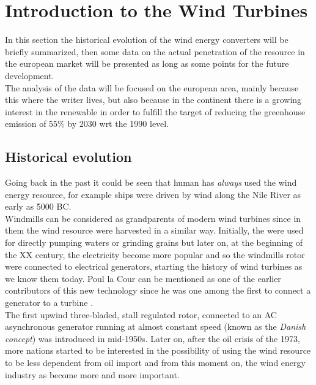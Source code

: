 \newpage
\section{Introduction to the Wind Turbines}\label{sec:c_WT_characteristics}
In this section the historical evolution of the wind energy converters will be briefly summarized, then some data on the actual penetration of the resource in the european market will be presented as long as some points for the future development. \\
The analysis of the data will be focused on the european area, mainly because this where the writer lives, but also because in the continent there is a growing interest in the renewable in order to fulfill the target of reducing the greenhouse emission of 55\% by 2030 wrt the 1990 level. 

\subsection{Historical evolution}
Going back in the past it could be seen that human has \textit{always} used the wind energy resource, for example ships were driven by wind along the Nile River as early as 5000 BC.\\
Windmills can be considered as grandparents of modern wind turbines since in them the wind resource were harvested in a similar way. Initially, the were used for directly pumping waters or grinding grains but later on, at the beginning of the XX century, the electricity become more popular and so the windmills rotor were connected to electrical generators, starting the history of wind turbines as we know them today. Poul la Cour can be mentioned as one of the earlier contributors of this new technology since he was one among the first to connect a generator to a turbine \cite{Aerodynamics_of_wind_turbines}. \\
The first upwind three-bladed, stall regulated rotor, connected to an AC asynchronous generator running at almost constant speed (known as the \textit{Danish concept}) was introduced in mid-1950s. Later on, after the oil crisis of the 1973, more nations started to be interested in the possibility of using the wind resource to be less dependent from oil import and from this moment on, the wind energy industry as become more and more important. 

